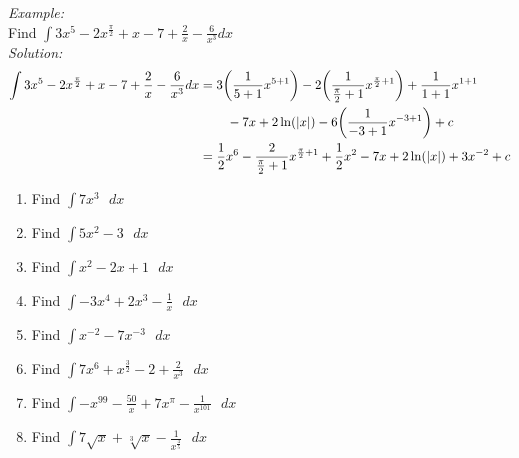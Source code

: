 \documentclass[12pt]{article}
\theoremstyle{remark}
\begin{document}
\begin{mdframed}[style=TheoremFrame]
\textit{Example:}\\

Find $\displaystyle{ \int 3x^5 - 2x^\frac{\pi}{2} + x -7 + \frac{2}{x} - \frac{6}{x^3}dx}$\\

\textit{Solution:}\\
\begin{align*}
\int 3x^5 - 2x^{\frac{\pi}{2}} + x -7 + \frac{2}{x} - \frac{6}{x^3} dx &= 3\bigg( \frac{1}{5+1} x^{5+1} \bigg) -2 \bigg(\frac{1}{\frac{\pi}{2}+1} x^{\frac{\pi}{2}+1} \bigg) + \frac{1}{1+1} x^{1+1}\\
& \hspace{0.75cm} -7x + 2\ln(|x|) - 6 \bigg( \frac{1}{-3+1} x^{-3+1} \bigg) + c\\
&= \frac{1}{2}x^6 -\frac{2}{\frac{\pi}{2}+1} x^{\frac{\pi}{2}+1}+ \frac{1}{2}x^2 -7x + 2\ln(|x|) +3x^{-2} + c
\end{align*}

\end{mdframed}
\newpage

\begin{enumerate}

\item Find $\displaystyle{ \int 7x^3 \text{ }dx}$
\vspace{4cm} 

\item Find $\displaystyle{ \int 5x^2 - 3 \text{ }dx}$
\vspace{4cm} 
\item Find $\displaystyle{ \int x^2 -2x + 1 \text{ }dx}$
\vspace{4cm} 

\item Find $\displaystyle{ \int -3x^4 +2x^3 - \frac{1}{x} \text{ }dx}$
\vspace{4cm} 
\newpage
\item Find $\displaystyle{ \int x^{-2} -7x^{-3} \text{ }dx}$
\vspace{4cm} 
\item Find $\displaystyle{ \int 7x^6 + x^{\frac{3}{2}} -2 + \frac{2}{x^3} \text{ }dx}$
\vspace{4cm} 
\item Find $\displaystyle{ \int -x^{99} -\frac{50}{x} + 7x^{\pi} - \frac{1}{x^{101}} \text{ }dx}$
\vspace{4cm} 
\item Find $\displaystyle{ \int 7\sqrt{x} + \sqrt[3]{x} - \frac{1}{x^{\frac{4}{5}}}\text{ }dx}$
\vspace{4cm} 
\end{enumerate}
\end{document}
